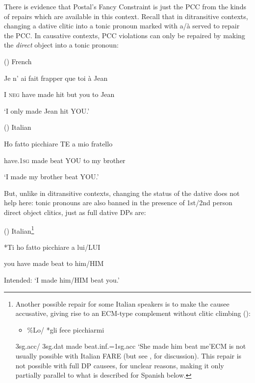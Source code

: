 \documentclass[output=paper,modfonts,nonflat]{langsci/langscibook}
\begin{document}
There is evidence that Postal’s Fancy Constraint is just the PCC from the kinds of repairs which are available in this context. Recall that in ditransitive contexts, changing a dative clitic into a tonic pronoun marked with a/à served to repair the PCC. In causative contexts, PCC violations can only be repaired by making the \textit{direct} object into a tonic pronoun:

()  French

Je   n’  ai   fait   frapper   que   toi   à   Jean

  I   \textsc{neg}   have   made   hit   but   you   to   Jean

  ‘I only made Jean hit YOU.’

()  Italian

Ho       fatto   picchiare   TE  a  mio  fratello

  have.\textsc{1sg}   made   beat      YOU  to  my  brother

  ‘I made my brother beat YOU.’

But, unlike in ditransitive contexts, changing the status of the dative does not help here: tonic pronouns are also banned in the presence of 1st/2nd person direct object clitics, just as full dative DPs are:

()  Italian\footnote{Another possible repair for some Italian speakers is to make the causee accusative, giving rise to an ECM-type complement without clitic climbing (\citealt{SchifanoSheehan2017}):

\begin{itemize}
\item \begin{styleListParagraph}
\%Lo/ *gli      fece      picchiarmi
\end{styleListParagraph}
\end{itemize}
    3sg.acc/  3sg.dat made    beat.inf.=1sg.acc      ‘She made him beat me’ECM is not usually possible with Italian FARE (but see \citealt{Burzio1986}, \citealt{SchifanoSheehan2017} for discussion). This repair is not possible with full DP causees, for unclear reasons, making it only partially parallel to what is described for Spanish below.} 

*Ti ho        fatto   picchiare   a    lui/LUI

  you have   made   beat     to him/HIM

  Intended: ‘I made him/HIM beat you.’
\end{document}
